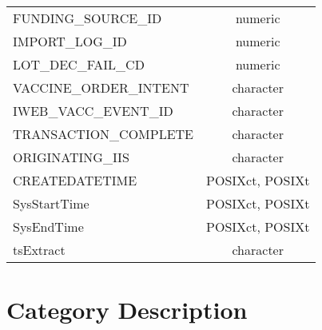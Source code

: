 \documentclass[
  letterpaper,
  DIV=11,
  numbers=noendperiod]{scrreprt}
\begin{document}
\begin{longtable}{lc}
FUNDING\_SOURCE\_ID & numeric \\ 
IMPORT\_LOG\_ID & numeric \\ 
LOT\_DEC\_FAIL\_CD & numeric \\ 
VACCINE\_ORDER\_INTENT & character \\ 
IWEB\_VACC\_EVENT\_ID & character \\ 
TRANSACTION\_COMPLETE & character \\ 
ORIGINATING\_IIS & character \\ 
CREATEDATETIME & POSIXct, POSIXt \\ 
SysStartTime & POSIXct, POSIXt \\ 
SysEndTime & POSIXct, POSIXt \\ 
tsExtract & character \\ 
\bottomrule
\end{longtable}

\hypertarget{category-description-44}{%
\section*{Category Description}\label{category-description-44}}
\end{document}
